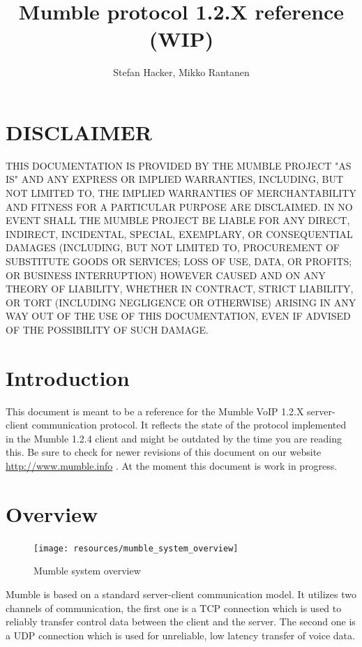 \documentclass[11pt]{article} %
\title{Mumble protocol 1.2.X reference (WIP)}
\author{Stefan Hacker, Mikko Rantanen}
\begin{document}
\maketitle

\newpage
\section*{DISCLAIMER}

THIS DOCUMENTATION IS PROVIDED BY THE MUMBLE PROJECT "AS IS" AND ANY EXPRESS OR IMPLIED WARRANTIES, INCLUDING, BUT NOT LIMITED TO, THE IMPLIED WARRANTIES OF MERCHANTABILITY AND FITNESS FOR A PARTICULAR PURPOSE ARE DISCLAIMED. IN NO EVENT SHALL THE MUMBLE PROJECT BE LIABLE FOR ANY DIRECT, INDIRECT, INCIDENTAL, SPECIAL, EXEMPLARY, OR CONSEQUENTIAL DAMAGES (INCLUDING, BUT NOT LIMITED TO, PROCUREMENT OF SUBSTITUTE GOODS OR SERVICES; LOSS OF USE, DATA, OR PROFITS; OR BUSINESS INTERRUPTION) HOWEVER CAUSED AND ON ANY THEORY OF LIABILITY, WHETHER IN CONTRACT, STRICT LIABILITY, OR TORT (INCLUDING NEGLIGENCE OR OTHERWISE) ARISING IN ANY WAY OUT OF THE USE OF THIS DOCUMENTATION, EVEN IF ADVISED OF THE POSSIBILITY OF SUCH DAMAGE. 

\tableofcontents
\newpage

\section{Introduction}
This document is meant to be a reference for the Mumble VoIP 1.2.X server-client communication protocol. It reflects the state of the protocol implemented in the Mumble 1.2.4 client and might be outdated by the time you are reading this. Be sure to check for newer revisions of this document on our website \url{http://www.mumble.info} . At the moment this document is work in progress.

\section{Overview}

\begin{figure}[ht]
	\centering
	\texttt{[image: resources/mumble\_system\_overview]}
	\caption{Mumble system overview}
	\label{fig:mumble_system_overview}
\end{figure}

Mumble is based on a standard server-client communication model. It utilizes two channels of communication, the first one is a TCP connection which is used to reliably transfer control data between the client and the server. The second one is a UDP connection which is used for unreliable, low latency transfer of voice data.
\end{document}
